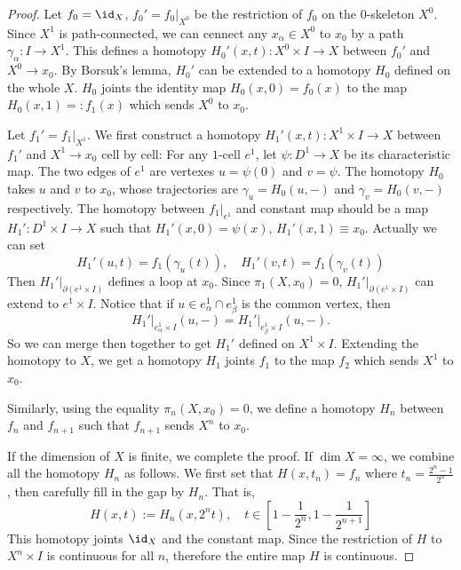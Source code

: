     \begin{proof}
        Let $f_0 = \id_X$, $f_0'=f_0\big|_{X^0}$ be the restriction of 
        $f_0$ on the $0$-skeleton $X^0$. Since $X^1$ is path-connected, 
        we can cennect any $x_\alpha\in X^0$ to $x_0$ by a path 
        $\gamma_\alpha:I\to X^1$. This defines a homotopy 
        $H_0'(x,t):X^0\times I\to X$ between $f_0'$ and $X^0\to x_0$. 
        By Borsuk's lemma, $H_0'$ can be extended to a homotopy $H_0$ 
        defined on the whole $X$. $H_0$ joints the identity map 
        $H_0(x,0)=f_0(x)$ to the map $H_0(x,1)=:f_1(x)$ which sends 
        $X^0$ to $x_0$.

        Let $f_1'=f_1\big|_{X^1}$. We first construct a homotopy 
        $H_1'(x,t):X^1\times I\to X$ between $f_1'$ and $X^1\to x_0$ 
        cell by cell: For any $1$-cell $e^1$, let 
        $\psi:D^1\to X$ be its characteristic map. The two edges of 
        $e^1$ are vertexes $u=\psi(0)$ and $v=\psi$. 
        The homotopy $H_0$ takes $u$ and $v$ to $x_0$, whose trajectories 
        are $\gamma_u=H_0(u,-)$ and $\gamma_v=H_0(v,-)$ respectively. 
        The homotopy between $f_1\big|_{e^1}$ and constant map should be a 
        map $H_1':D^1\times I\to X$ such that $H_1'(x,0)=\psi(x)$, 
        $H_1'(x,1)\equiv x_0$. Actually we can set 
        \begin{equation*}
            H_1'(u,t) = f_1(\gamma_u(t)),\quad H_1'(v,t) = f_1(\gamma_v(t))
        \end{equation*}
        Then $H_1'\big|_{\partial(e^1\times I)}$ defines a loop at $x_0$. 
        Since $\pi_1(X,x_0) = 0$, $H_1'\big|_{\partial(e^1\times I)}$ 
        can extend to $e^1\times I$. Notice that if 
        $u\in e^1_\alpha\cap e^1_\beta$ is the common vertex, then
        \begin{equation*}
            H_1'\big|_{e^1_\alpha\times I}(u,-) = H_1'\big|_{e^1_\beta\times I}(u,-).
        \end{equation*}
        So we can merge then together to get $H_1'$ defined on $X^1\times I$.
        Extending the homotopy to $X$, we get a homotopy 
        $H_1$ joints $f_1$ to the map $f_2$ which sends $X^1$ to $x_0$. 

        Similarly, using the equality $\pi_n(X,x_0)=0$, 
        we define a homotopy $H_n$ between $f_n$ and $f_{n+1}$ such that 
        $f_{n+1}$ sends $X^n$ to $x_0$. 

        If the dimension of $X$ is finite, we complete the proof. 
        If $\dim X=\infty$, we combine all the homotopy $H_n$ as follows.
        We first set that $H(x,t_n) = f_n$ where $t_n=\frac{2^n-1}{2^n}$, 
        then carefully fill in the gap by $H_n$. That is,
        \begin{equation*}
            H(x,t):=H_n(x,2^{n}t),\quad 
            t\in[1-\frac{1}{2^n},1-\frac{1}{2^{n+1}}]
        \end{equation*}
        This homotopy joints $\id_X$ and the constant map. Since the 
        restriction of $H$ to $X^n\times I$ is continuous for all $n$, 
        therefore the entire map $H$ is continuous.
    \end{proof}

